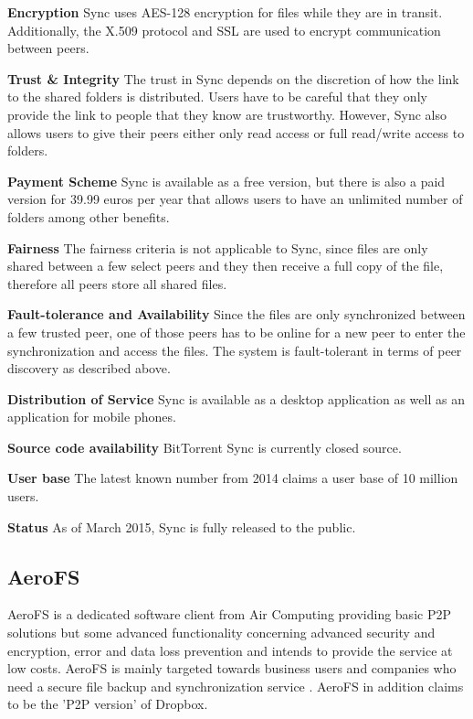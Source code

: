 \textbf{Encryption}
Sync uses AES-128 encryption for files while they are in transit. Additionally, the X.509 protocol and SSL are used to encrypt communication between peers.

\textbf{Trust \& Integrity}
The trust in Sync depends on the discretion of how the link to the shared folders is distributed. Users have to be careful that they only provide the link to people that they know are trustworthy. However, Sync also allows users to give their peers either only read access or full read/write access to folders.

\textbf{Payment Scheme}
Sync is available as a free version, but there is also a paid version for 39.99 euros per year that allows users to have an unlimited number of folders among other benefits.

\textbf{Fairness}
The fairness criteria is not applicable to Sync, since files are only shared between a few select peers and they then receive a full copy of the file, therefore all peers store all shared files.

\textbf{Fault-tolerance and Availability}
Since the files are only synchronized between a few trusted peer, one of those peers has to be online for a new peer to enter the synchronization and access the files. The system is fault-tolerant in terms of peer discovery as described above.

\textbf{Distribution of Service}
Sync is available as a desktop application as well as an application for mobile phones.

\textbf{Source code availability}
BitTorrent Sync is currently closed source.

\textbf{User base}
The latest known number from 2014 claims a user base of 10 million users.

\textbf{Status}
As of March 2015, Sync is fully released to the public.

\subsection{AeroFS}
\label{subsec:Aerofs}
AeroFS is a dedicated software client from Air Computing providing basic P2P solutions but some advanced functionality concerning advanced security and encryption, error and data loss prevention and intends to provide the service at low costs. AeroFS is mainly targeted towards business users and companies who need a secure file backup and synchronization service \cite{aerofs}. AeroFS in addition claims to be the 'P2P version' of Dropbox.

